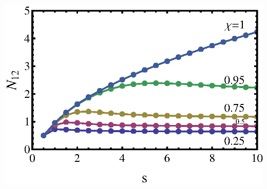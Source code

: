 \documentclass[a0paper,portrait]{baposter}
\begin{document}
\begin{poster}
{\hspace*{10.7cm}\includegraphics*[scale=.3]{fig8}
\vspace*{1.cm}


}


\end{poster}
\end{document}
